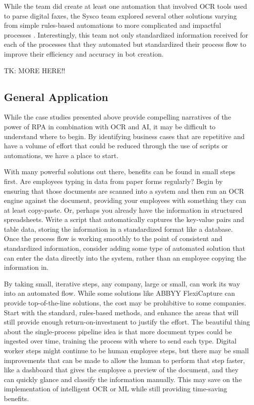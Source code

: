 \documentclass[conference, draftcls]{IEEEtran}
\begin{document}
While the team did create at least one automation that involved OCR tools used to parse digital faxes, the Sysco team explored several other solutions varying from simple rules-based automations to more complicated and impactful processes \cite{bpcafe2021sysco}. Interestingly, this team not only standardized information received for each of the processes that they automated but standardized their process flow to improve their efficiency and accuracy in bot creation.

TK: MORE HERE!!

\subsection{General Application}
While the case studies presented above provide compelling narratives of the power of RPA in combination with OCR and AI, it may be difficult to understand where to begin. By identifying business cases that are repetitive and have a volume of effort that could be reduced through the use of scripts or automations, we have a place to start.

With many powerful solutions out there, benefits can be found in small steps first. Are employees typing in data from paper forms regularly? Begin by ensuring that those documents are scanned into a system and then run an OCR engine against the document, providing your employees with something they can at least copy-paste. Or, perhaps you already have the information in structured spreadsheets. Write a script that automatically captures the key-value pairs and table data, storing the information in a standardized format like a database. Once the process flow is working smoothly to the point of consistent and standardized information, consider adding some type of automated solution that can enter the data directly into the system, rather than an employee copying the information in.

By taking small, iterative steps, any company, large or small, can work its way into an automated flow. While some solutions like ABBYY FlexiCapture can provide top-of-the-line solutions, the cost may be prohibitive to some companies. Start with the standard, rules-based methods, and enhance the areas that will still provide enough return-on-investment to justify the effort. The beautiful thing about the single-process pipeline idea is that more document types could be ingested over time, training the process with where to send each type. Digital worker steps might continue to be human employee steps, but there may be small improvements that can be made to allow the human to perform that step faster, like a dashboard that gives the employee a preview of the document, and they can quickly glance and classify the information manually. This may save on the implementation of intelligent OCR or ML while still providing time-saving benefits.
\end{document}
